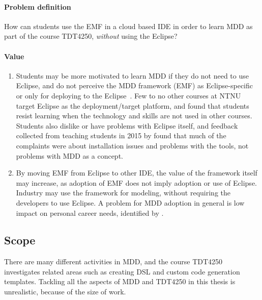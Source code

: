 \paragraph{Problem definition}
How can students use the \acrfull{EMF} in a \gls{cloud} based \acrfull{IDE} in order to learn \acrfull{MDD} as part of the course \gls{TDT4250}, \textit{without} using the \gls{Eclipse}?

\paragraph{Value}
\begin{enumerate}
  \item Students may be more motivated to learn \acrshort{MDD} if they do not need to use \gls{Eclipse}, and do not perceive the \acrshort{MDD} framework (\acrshort{EMF}) as \gls{Eclipse}-specific or only for deploying to the \gls{Eclipse}~\cite[p.~2]{rekstadModelingEnvironmentCloud2020}.
  Few to no other courses at \acrshort{NTNU} target \gls{Eclipse} as the deployment/target platform, and \textcite{kuzniarzTeachingModelDrivenSoftware2016} found that students resist learning when the technology and skills are not used in other courses.
  Students also dislike or have problems with \gls{Eclipse} itself, and feedback collected from teaching students in 2015 by \textcite{jordicabotFailedConvinceMy2015} found that much of the complaints were about installation issues and problems with the tools, not problems with \acrshort{MDD} as a concept.
  
  \item By moving \acrshort{EMF} from \gls{Eclipse} to other \gls{IDE}, the value of the framework itself may increase, as adoption of \acrshort{EMF} does not imply adoption or use of \gls{Eclipse}.
  Industry may use the framework for modeling, without requiring the developers to use \gls{Eclipse}.
  A problem for \acrshort{MDD} adoption in general is low impact on personal career needs, identified by \textcite{jonwhittleTaxonomyToolrelatedIssues2015}.
\end{enumerate}

\subsection{Scope}

There are many different activities in \acrshort{MDD}, and the course \gls{TDT4250} investigates related areas such as creating \acrfull{DSL} and custom code generation templates.
Tackling all the aspects of \acrshort{MDD} and \gls{TDT4250} in this thesis is unrealistic, because of the size of work.

